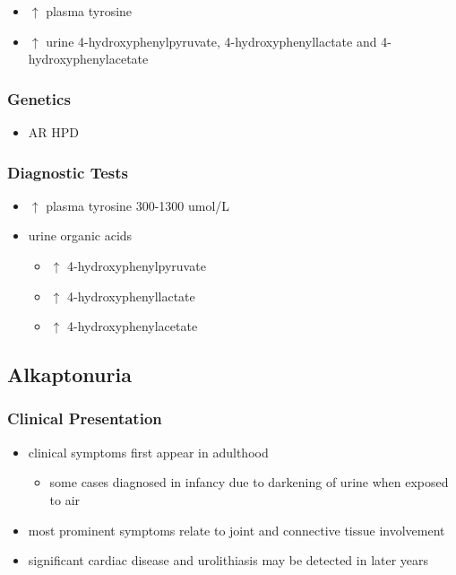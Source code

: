 \documentclass[12pt]{scrartcl}
\begin{document}

\begin{itemize}
\item \(\uparrow\) plasma tyrosine
\item \(\uparrow\) urine 4-hydroxyphenylpyruvate, 4-hydroxyphenyllactate and 4-hydroxyphenylacetate
\end{itemize}
\subsubsection{Genetics}
\label{sec:org5303237}
\begin{itemize}
\item AR HPD
\end{itemize}
\subsubsection{Diagnostic Tests}
\label{sec:org75f4b76}
\begin{itemize}
\item \(\uparrow\) plasma tyrosine 300-1300 umol/L
\item urine organic acids
\begin{itemize}
\item \(\uparrow\) 4-hydroxyphenylpyruvate
\item \(\uparrow\) 4-hydroxyphenyllactate
\item \(\uparrow\) 4-hydroxyphenylacetate
\end{itemize}
\end{itemize}

\subsection{Alkaptonuria}
\label{sec:org2fd0682}
\subsubsection{Clinical Presentation}
\label{sec:orgdb697cf}
\begin{itemize}
\item clinical symptoms first appear in adulthood
\begin{itemize}
\item some cases diagnosed in infancy due to darkening of urine when
exposed to air
\end{itemize}
\item most prominent symptoms relate to joint and connective tissue involvement
\item significant cardiac disease and urolithiasis may be detected in later years
\end{itemize}
\end{document}
